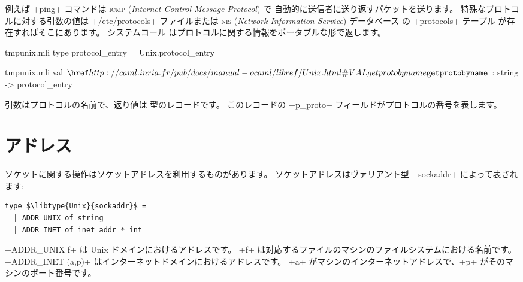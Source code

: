 例えば \ml+ping+ コマンドは \textsc{icmp} (\emph{Internet Control Message Protocol}) で
自動的に送信者に送り返すパケットを送ります。
特殊なプロトコルに対する引数の値は \ml+/etc/protocols+ ファイルまたは
\textsc{nis} (\emph{Network Information Service}) データベース の \ml+protocols+ テーブル
が存在すればそこにあります。
システムコール  はプロトコルに関する情報をポータブルな形で返します。
%
\begin{codefile}{tmpunix.mli}
type protocol_entry = Unix.protocol_entry
\end{codefile}
%
\begin{listingcodefile}{tmpunix.mli}
val $\libvalue{Unix}{getprotobyname}$ : string -> protocol_entry
\end{listingcodefile}
%
引数はプロトコルの名前で、返り値は  型のレコードです。
このレコードの \ml+p_proto+ フィールドがプロトコルの番号を表します。

\section{アドレス}

ソケットに関する操作はソケットアドレスを利用するものがあります。
ソケットアドレスはヴァリアント型 \ml+sockaddr+ によって表されます:
\begin{lstlisting}
type $\libtype{Unix}{sockaddr}$ =
  | ADDR_UNIX of string
  | ADDR_INET of inet_addr * int
\end{lstlisting}
\ml+ADDR_UNIX f+ は Unix ドメインにおけるアドレスです。
\ml+f+ は対応するファイルのマシンのファイルシステムにおける名前です。
\ml+ADDR_INET (a,p)+ はインターネットドメインにおけるアドレスです。
\ml+a+ がマシンのインターネットアドレスで、\ml+p+ がそのマシンのポート番号です。

